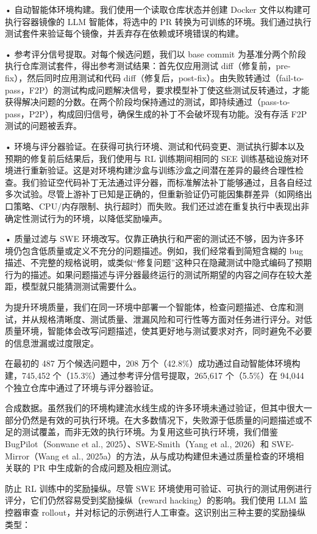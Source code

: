 \documentclass[
  10
]{article}
\begin{document}
• 自动智能体环境构建。我们使用一个读取仓库状态并创建 Docker 文件以构建可执行容器镜像的 LLM 智能体，将选中的 PR 转换为可训练的环境。我们通过执行测试套件来验证每个镜像，并丢弃存在依赖或环境错误的构建。

• 参考评分信号提取。对每个候选问题，我们以 base commit 为基准分两个阶段执行仓库测试套件，得出参考测试结果：首先仅应用测试 diff（修复前，pre-fix），然后同时应用测试和代码 diff（修复后，post-fix）。由失败转通过（fail-to-pass，F2P）的测试构成问题解决信号，要求模型补丁使这些测试反转通过，才能获得解决问题的分数。在两个阶段均保持通过的测试，即持续通过（pass-to-pass，P2P），构成回归信号，确保生成的补丁不会破坏现有功能。没有存活 F2P 测试的问题被丢弃。

• 环境与评分器验证。在获得可执行环境、测试和代码变更、测试执行脚本以及预期的修复前后结果后，我们使用与 RL 训练期间相同的 SEE 训练基础设施对环境进行重新验证。这是对环境构建沙盒与训练沙盒之间潜在差异的最终合理性检查。我们验证空代码补丁无法通过评分器，而标准解法补丁能够通过，且各自经过多次试验。尽管上游补丁已知是正确的，但重新验证仍可能因集群差异（如网络出口策略、CPU/内存限制、执行超时）而失败。我们还过滤在重复执行中表现出非确定性测试行为的环境，以降低奖励噪声。

• 质量过滤与 SWE 环境改写。仅靠正确执行和严密的测试还不够，因为许多环境仍包含低质量或定义不充分的问题描述。例如，我们经常看到简短含糊的 bug 描述、不完整的规格说明，或类似“修复问题”这种只在隐藏测试中隐式编码了预期行为的描述。如果问题描述与评分器最终运行的测试所期望的内容之间存在较大差距，模型就只能猜测测试需要什么。

为提升环境质量，我们在同一环境中部署一个智能体，检查问题描述、仓库和测试，并从规格清晰度、测试质量、泄漏风险和可行性等方面对任务进行评分。对低质量环境，智能体会改写问题描述，使其更好地与测试要求对齐，同时避免不必要的信息泄漏或过度限定。

在最初的 487 万个候选问题中，208 万个（42.8\%）成功通过自动智能体环境构建，745,452 个（15.3\%）通过参考评分信号提取，265,617 个（5.5\%）在 94,044 个独立仓库中通过了环境与评分器验证。

合成数据。虽然我们的环境构建流水线生成的许多环境未通过验证，但其中很大一部分仍然是有效的可执行环境。在大多数情况下，失败源于低质量的问题描述或不足的测试覆盖，而非无效的执行环境。为复用这些可执行环境，我们借鉴 BugPilot（Sonwane et al., 2025）、SWE-Smith（Yang et al., 2026）和 SWE-Mirror（Wang et al., 2025a）的方法，从与成功构建但未通过质量检查的环境相关联的 PR 中生成新的合成问题及相应测试。

防止 RL 训练中的奖励操纵。尽管 SWE 环境使用可验证、可执行的测试用例进行评分，它们仍然容易受到奖励操纵（reward hacking）的影响。我们使用 LLM 监控器审查 rollout，并对标记的示例进行人工审查。这识别出三种主要的奖励操纵类型：
\end{document}
